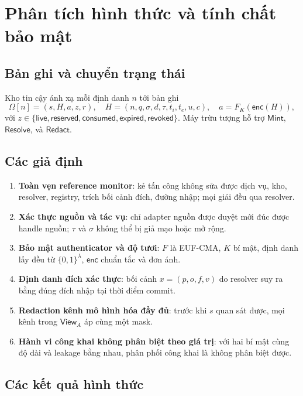 \documentclass[11pt,a4paper]{article}
\newcommand{\term}[1]{\textbf{#1}}
\newcommand{\Mint}{\ensuremath{\mathsf{Mint}}}
\newcommand{\Resolve}{\ensuremath{\mathsf{Resolve}}}
\newcommand{\Redact}{\ensuremath{\mathsf{Redact}}}
\newcommand{\View}{\ensuremath{\mathsf{View}}}
\begin{document}
\section{Phân tích hình thức và tính chất bảo mật}

\subsection{Bản ghi và chuyển trạng thái}

Kho tin cậy ánh xạ mỗi định danh $n$ tới bản ghi
\[
\Omega[n] = (s, H, a, z, r), \quad
H = (n, q, \sigma, d, \tau, t_i, t_e, u, c), \quad a = F_K(\mathsf{enc}(H)),
\]
với $z \in \{\mathsf{live}, \mathsf{reserved}, \mathsf{consumed}, \mathsf{expired}, \mathsf{revoked}\}$.
Máy trừu tượng hỗ trợ $\Mint$, $\Resolve$, và $\Redact$.

\subsection{Các giả định}

\begin{enumerate}
  \item \term{Toàn vẹn reference monitor}: kẻ tấn công không sửa được dịch vụ, kho, resolver, registry, trích
        bối cảnh đích, đường nhập; mọi giải đều qua resolver.
  \item \term{Xác thực nguồn và tác vụ}: chỉ adapter nguồn được duyệt mới đúc được handle nguồn; $\tau$ và
        $\sigma$ không thể bị giả mạo hoặc mở rộng.
  \item \term{Bảo mật authenticator và độ tươi}: $F$ là EUF-CMA, $K$ bí mật, định danh lấy đều từ $\{0,1\}^\lambda$,
        $\mathsf{enc}$ chuẩn tắc và đơn ánh.
  \item \term{Định danh đích xác thực}: bối cảnh $x = (p, o, f, v)$ do resolver suy ra bằng đúng đích nhập tại
        thời điểm commit.
  \item \term{Redaction kênh mô hình hóa đầy đủ}: trước khi $s$ quan sát được, mọi kênh trong $\View_A$ áp cùng
        một mask.
  \item \term{Hành vi công khai không phân biệt theo giá trị}: với hai bí mật cùng độ dài và leakage bằng nhau,
        phân phối công khai là không phân biệt được.
\end{enumerate}

\subsection{Các kết quả hình thức}
\end{document}
